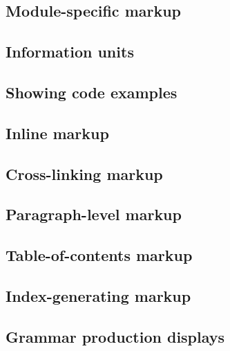 \documentclass[]{book}
\begin{document}
\hypertarget{module-specific-markup}{%
\subsection{Module-specific markup}\label{module-specific-markup}}

\hypertarget{information-units}{%
\subsection{Information units}\label{information-units}}

\hypertarget{showing-code-examples}{%
\subsection{Showing code examples}\label{showing-code-examples}}

\hypertarget{inline-markup-1}{%
\subsection{Inline markup}\label{inline-markup-1}}

\hypertarget{cross-linking-markup}{%
\subsection{Cross-linking markup}\label{cross-linking-markup}}

\hypertarget{paragraph-level-markup}{%
\subsection{Paragraph-level markup}\label{paragraph-level-markup}}

\hypertarget{table-of-contents-markup}{%
\subsection{Table-of-contents markup}\label{table-of-contents-markup}}

\hypertarget{index-generating-markup}{%
\subsection{Index-generating markup}\label{index-generating-markup}}

\hypertarget{grammar-production-displays}{%
\subsection{Grammar production displays}\label{grammar-production-displays}}
\end{document}
